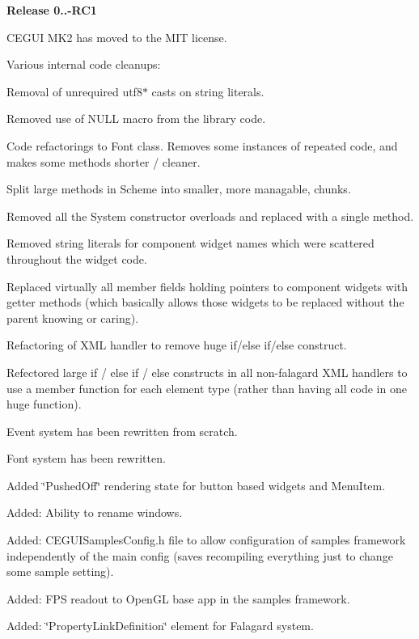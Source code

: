 {\bfseries{Release 0..-\/R\+C1}}
\begin{DoxyItemize}
\item C\+E\+G\+UI M\+K2 has moved to the M\+IT license.
\item Various internal code cleanups\+:
\begin{DoxyItemize}
\item Removal of unrequired utf8$\ast$ casts on string literals.
\item Removed use of N\+U\+LL macro from the library code.
\item Code refactorings to Font class. Removes some instances of repeated code, and makes some methods shorter / cleaner.
\item Split large methods in Scheme into smaller, more managable, chunks.
\item Removed all the System constructor overloads and replaced with a single method.
\item Removed string literals for component widget names which were scattered throughout the widget code.
\item Replaced virtually all member fields holding pointers to component widgets with getter methods (which basically allows those widgets to be replaced without the parent knowing or caring).
\item Refactoring of X\+ML handler to remove huge if/else if/else construct.
\item Refectored large if / else if / else constructs in all non-\/falagard X\+ML handlers to use a member function for each element type (rather than having all code in one huge function).
\item Event system has been rewritten from scratch.
\item Font system has been rewritten.
\end{DoxyItemize}
\item Added \char`\"{}\+Pushed\+Off\char`\"{} rendering state for button based widgets and Menu\+Item.
\item Added\+: Ability to rename windows.
\item Added\+: C\+E\+G\+U\+I\+Samples\+Config.\+h file to allow configuration of samples framework independently of the main config (saves recompiling everything just to change some sample setting).
\item Added\+: F\+PS readout to Open\+GL base app in the samples framework.
\item Added\+: \char`\"{}\+Property\+Link\+Definition\char`\"{} element for Falagard system.

\end{DoxyItemize}
